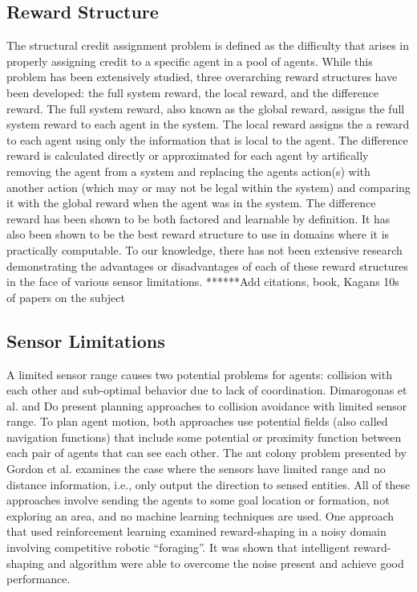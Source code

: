 \documentclass[letterpaper, 10 pt, conference]{ieeeconf}  %
\begin{document}
\subsection{Reward Structure}
The structural credit assignment problem is defined as the difficulty that arises in properly assigning credit 
to a specific agent in a pool of agents.  While this problem has been extensively studied, three overarching reward 
structures have been developed: the full system reward, the local reward, and the difference reward.  The full system reward, 
also known as the global reward, assigns the full system reward to each agent in the system.  The local reward assigns the a reward
to each agent using only the information that is local to the agent. The difference reward is calculated directly or approximated for each agent by artifically removing the agent from a system and replacing the agents action(s) with another action (which may or may not be legal within the system) and comparing it with the global reward when the agent was in the system. The difference reward has been shown to be both factored and learnable by definition. It has also been shown to be the best reward structure to use in
domains where it is practically computable. To our knowledge, there has not been extensive 
research demonstrating the advantages or disadvantages of each of these reward structures in 
the face of various sensor limitations. ******Add citations, book, Kagans 10s of papers on the subject

\subsection{Sensor Limitations}
A limited sensor range causes two potential problems for agents:
collision with each other and sub-optimal behavior due to lack of
coordination. Dimarogonas et al. \cite{dimarogonas2007decentralized} and Do \cite{do2007bounded} present planning approaches to collision avoidance with limited sensor range. To plan agent motion, both approaches use potential fields (also called
navigation functions) that include some potential or proximity function between each pair of agents that can see each other. The ant colony problem presented by Gordon et al. \cite{gordon2004gathering} examines the case where the sensors have limited range and no distance information, i.e., only output the direction to sensed entities. All of these approaches involve sending the agents to some goal location or formation, not exploring an area, and no machine learning techniques are used. One approach that used reinforcement learning examined reward-shaping in a noisy domain involving competitive robotic “foraging”. It was shown that intelligent reward-shaping and algorithm were able to overcome the noise present and achieve good performance\cite{mataric1997reinforcement}.
\end{document}
